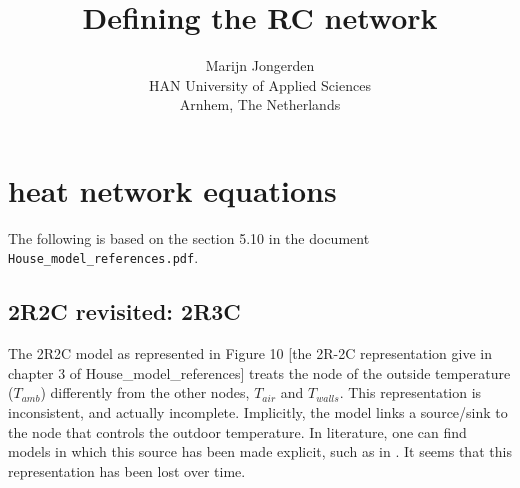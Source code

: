 

\title{Defining the RC network}
\author{Marijn Jongerden\\
HAN University of Applied Sciences\\
Arnhem, The Netherlands}


	
\ldf  %


\ldf

\maketitle
\section{heat network equations}

The following is based on the section 5.10 in the document \texttt{House\_model\_references.pdf}.

\subsection{2R2C revisited: 2R3C}
\label{sec:2R3C}
The 2R2C model as represented in Figure 10 [the 2R-2C representation give in chapter 3 of House\_model\_references] treats the node of the outside temperature ($T_{amb}$) differently from the other nodes, $T_{air}$ and $T_{walls}$.  This representation is inconsistent, and actually incomplete. Implicitly, the model links a source/sink to the node that controls the outdoor temperature. In literature, one can find models in which this source has been made explicit, such as in \cite{achterbos}. It seems that this representation has been lost over time. 

